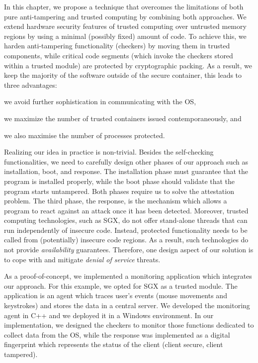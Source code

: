 In this chapter, we propose a technique that overcomes the limitations of both 
pure anti-tampering and trusted computing by combining both approaches.
We extend hardware security features of trusted computing over untrusted memory 
regions by using a minimal (possibly fixed) amount of code.
To achieve this, we harden anti-tampering functionality (\eg checkers) by 
moving them in trusted components, while critical code segments
(which invoke the checkers stored within a trusted module) are protected by 
cryptographic packing.
As a result, we keep the majority of the software outside of the secure 
container, this leads to three advantages:
\begin{enumerate*}[label=(\roman*)]
	\item we avoid further sophistication in communicating with the OS,
	\item we maximize the number of trusted containers issued 
	contemporaneously, and 
	\item we also maximise the number of processes protected.
\end{enumerate*}

Realizing our idea in practice is non-trivial.
Besides the self-checking functionalities, we need to carefully design other
phases of our approach such as installation, boot, and response.
The installation phase must guarantee that the program is installed properly, 
while 
the boot phase should validate that the program starts untampered. Both phases 
require us to solve the attestation problem.
The third phase, the response, is the mechanism which allows a program to 
react against an attack once it has been detected.
Moreover, trusted computing technologies, such as SGX, do not offer stand-alone 
threads 
that can run independently of insecure code. Instead, protected functionality 
needs 
to be called from (potentially) insecure code regions. As a result, such 
technologies  
do not provide \emph{availability} guarantees. 
Therefore, one design aspect of our solution is to cope with and mitigate 
\emph{denial of service} threats.

As a proof-of-concept, we implemented a monitoring application
which integrates our approach. 
For this example, we opted for SGX as a trusted module. 
The application is an agent which traces user's events (\ie mouse movements 
and keystrokes) and stores the data in a central server.
We developed the monitoring agent in C++ and we deployed it in a Windows 
environment.
In our implementation, we designed the checkers to monitor those
functions dedicated to collect data from the OS, while the response was 
implemented as a 
digital fingerprint which represents the status of the client 
(\ie client secure, client tampered).

